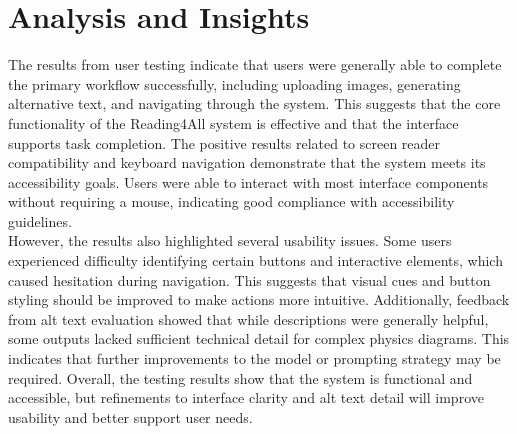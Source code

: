 \documentclass{article}
\begin{document}
\section{Analysis and Insights}
The results from user testing indicate that users were generally able to 
complete the primary workflow successfully, including uploading images, 
generating alternative text, and navigating through the system. This suggests 
that the core functionality of the Reading4All system is effective and that 
the interface supports task completion. The positive results related to screen reader compatibility and keyboard 
navigation demonstrate that the system meets its accessibility goals. Users 
were able to interact with most interface components without requiring a mouse, 
indicating good compliance with accessibility guidelines.\\

However, the results also highlighted several usability issues. Some users 
experienced difficulty identifying certain buttons and interactive elements, 
which caused hesitation during navigation. This suggests that visual cues and 
button styling should be improved to make actions more intuitive. Additionally, feedback from alt text evaluation showed that while descriptions 
were generally helpful, some outputs lacked sufficient technical detail for 
complex physics diagrams. This indicates that further improvements to the 
model or prompting strategy may be required. Overall, the testing results show that the system is functional and accessible, 
but refinements to interface clarity and alt text detail will improve usability 
and better support user needs.
\end{document}
